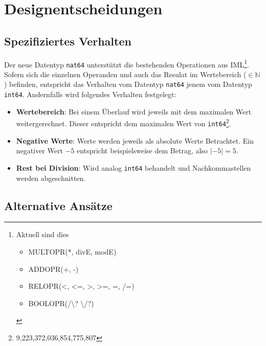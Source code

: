 \documentclass[10pt, a4paper, twocolumn]{article} %
\begin{document}
\section{Designentscheidungen}
\subsection{Spezifiziertes Verhalten}
Der neue Datentyp \texttt{nat64} unterstützt die bestehenden Operationen aus IML\footnote{Aktuell sind dies \begin{itemize}
                                                                                                                \item MULTOPR(*, divE, modE) \item ADDOPR(+, -) \item RELOPR(<, <=, >, >=, =, /=) \item BOOLOPR(/\textbackslash? \textbackslash/?)
\end{itemize}}.
Sofern sich die einzelnen Operanden und auch das Resulat im Wertebereich ($\in \mathbb{N}$) befinden, %
entspricht das Verhalten vom Datentyp \texttt{nat64} jenem vom Datentyp \texttt{int64}.
Andernfalls wird folgendes Verhalten festgelegt:

\begin{itemize} %
    \item \textbf{Wertebereich}: Bei einem Überlauf wird jeweils mit dem maximalen Wert weitergerechnet. Dieser entspricht dem maximalen Wert von \texttt{int64}\footnote{9,223,372,036,854,775,807}.
    \item \textbf{Negative Werte}: Werte werden jeweils als absolute Werte Betrachtet. Ein negativer Wert $-5$ entspricht beispielsweise dem Betrag, also $|-5| = 5$.
    \item \textbf{Rest bei Division}: Wird analog \texttt{int64} behandelt und Nachkommastellen werden abgeschnitten.
\end{itemize}

\subsection{Alternative Ansätze}

\end{document}

